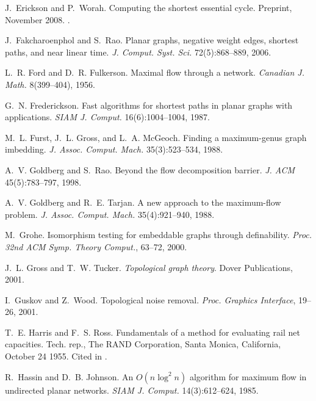 \documentclass{sig-alternate}
\begin{document}
\begin{thebibliography}{10}
J.~Erickson and P.~Worah.
\newblock Computing the shortest essential cycle.
\newblock Preprint, November 2008.
\newblock {}.

J.~Fakcharoenphol and S.~Rao.
\newblock Planar graphs, negative weight edges, shortest paths, and near linear
  time.
\newblock \emph{J. Comput. Syst. Sci.} 72(5):868--889, 2006.

L.~R. Ford and D.~R. Fulkerson.
\newblock Maximal flow through a network.
\newblock \emph{Canadian J. Math.} 8(399--404), 1956.

G.~N. Frederickson.
\newblock Fast algorithms for shortest paths in planar graphs with
  applications.
\newblock \emph{SIAM J. Comput.} 16(6):1004--1004, 1987.

M.~L. Furst, J.~L. Gross, and L.~A. McGeoch.
\newblock Finding a maximum-genus graph imbedding.
\newblock \emph{J. Assoc. Comput. Mach.} 35(3):523--534, 1988.

A.~V. Goldberg and S.~Rao.
\newblock Beyond the flow decomposition barrier.
\newblock \emph{J. ACM} 45(5):783--797, 1998.

A.~V. Goldberg and R.~E. Tarjan.
\newblock A new approach to the maximum-flow problem.
\newblock \emph{J. Assoc. Comput. Mach.} 35(4):921--940, 1988.

M.~Grohe.
\newblock Isomorphism testing for embeddable graphs through definability.
\newblock \emph{Proc. 32nd ACM Symp. Theory Comput.}, 63--72, 2000.

J.~L. Gross and T.~W. Tucker.
\newblock \emph{Topological graph theory}.
\newblock Dover Publications, 2001.

I.~Guskov and Z.~Wood.
\newblock Topological noise removal.
\newblock \emph{Proc. Graphics Interface}, 19--26, 2001.

T.~E. Harris and F.~S. Ross.
\newblock Fundamentals of a method for evaluating rail net capacities.
\newblock Tech. rep., The RAND Corporation, Santa Monica, California, October
  24 1955.
\newblock Cited in \cite{s-hco-05}.

R.~Hassin and D.~B. Johnson.
\newblock An {$O(n\log^2 n)$} algorithm for maximum flow in undirected planar
  networks.
\newblock \emph{SIAM J. Comput.} 14(3):612--624, 1985.


\end{thebibliography}
\end{document}
